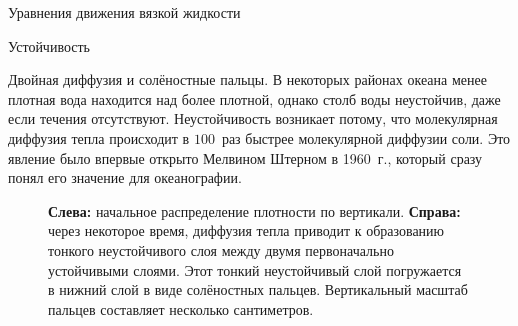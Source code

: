 \begin{chapter}{Уравнения движения вязкой жидкости}
\begin{section}{Устойчивость}
\begin{paragraph}{Двойная диффузия и солёностные пальцы.}
%
В некоторых районах океана менее плотная вода находится над более
плотной, однако столб воды неустойчив, даже если течения
отсутствуют. Неустойчивость возникает потому, что молекулярная
диффузия тепла происходит в $100$~раз быстрее молекулярной диффузии
соли. Это явление было впервые открыто Мелвином Штерном в 1960~г., 
который сразу понял его значение для океанографии.
%

\begin{figure}[h!]
\caption{\textbf{Слева:} начальное распределение плотности по
вертикали. \textbf{Справа:} через некоторое время, диффузия тепла приводит к
образованию тонкого неустойчивого слоя между двумя первоначально устойчивыми 
слоями. Этот тонкий неустойчивый слой погружается в нижний слой в виде 
солёностных пальцев. Вертикальный масштаб пальцев составляет несколько 
сантиметров.}
\label{fig:saltfingers}
\end{figure}
%


\end{paragraph}
\end{section}
\end{chapter}
